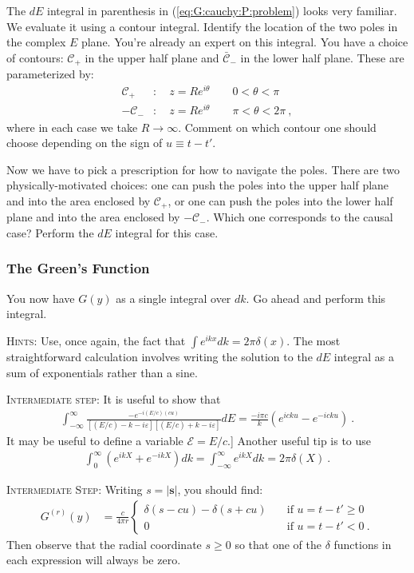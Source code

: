 \documentclass[12pt]{article}
\numberwithin{equation}{subsection}    %
\renewcommand{\vec}[1]{\mathbf{#1}} %
\begin{document}
The $dE$ integral in parenthesis in (\ref{eq:G:cauchy:P:problem}) looks very familiar. We evaluate it using a contour integral. Identify the location of the two poles in the complex $E$ plane.
%
You're already an expert on this integral.
%
You have a choice of contours: $\mathcal C_+$ in the upper half plane and $\bar{\mathcal C}_-$ in the lower half plane. These are parameterized by:
\begin{align}
	\mathcal C_+ &: \quad z = Re^{i\theta} \qquad  0 < \theta < \pi \\
	-{\mathcal C}_- &: \quad z = Re^{i\theta} \qquad \pi < \theta < 2 \pi \ ,
\end{align}
where in each case we take $R\to \infty$.
Comment on which contour one should choose depending on the sign of $u\equiv t-t'$.

Now we have to pick a prescription for how to navigate the poles. There are two physically-motivated choices: one can push the poles into the upper half plane and into the area enclosed by $\mathcal C_+$, or one can push the poles into the lower half plane and into the area enclosed by $-{\mathcal C}_-$. Which one corresponds to the causal case? Perform the $dE$ integral for this case.


\subsubsection{The Green's Function}

You now have $G(y)$ as a single integral over $dk$. Go ahead and perform this integral. 

\textsc{Hints}: Use, once again, the fact that $\int e^{ikx} dk = 2\pi \delta(x)$. The most straightforward calculation involves writing the solution to the $dE$ integral as a sum of exponentials rather than a sine. 

\textsc{Intermediate step}: It is useful to show that
\begin{align}
	\int_{-\infty}^\infty \frac{-e^{-i(E/c)(cu)}}{[(E/c)- k - i\varepsilon][(E/c)+k - i\varepsilon]}  dE = 
	\frac{-i\pi c}{k} \left(e^{icku}-e^{-icku}\right) \ .
\end{align}
It may be useful to define a variable $\mathcal E = E/c$.]
%
Another useful tip is to use
\begin{align}
	\int_0^\infty \left(e^{ikX} + e^{-ikX}\right) dk = 
	\int_{-\infty}^\infty e^{ikX} dk=
	2\pi \delta(X)
	 \ .
\end{align}


\textsc{Intermediate Step}: Writing $s = |\vec s|$, you should find:
\begin{align}
	G^{(r)}(y) &=
	\frac{c}{4\pi r}
	\left\{
	\begin{array}{ll}
		\delta(s-cu) - \delta(s+cu)
		&
		\quad\text{if $u=t-t' \geq 0$}
		\\
		0 & \quad\text{if $u=t-t' <0$} \ .
	\end{array}
	\right.
	\label{eq:Gr:Gs}
\end{align}
Then observe that the radial coordinate $s\geq 0$ so that one of the $\delta$ functions in each expression will always be zero. 
\end{document}
